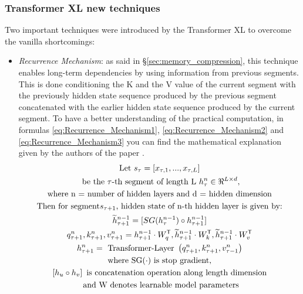 \subsubsection{Transformer XL new techniques}

Two important techniques were introduced by the Transformer XL to overcome the vanilla shortcomings:
\begin{itemize}
	\item \textit{Recurrence Mechanism}: as said in \S\ref{sec:memory_compression}, this technique enables long-term dependencies by using information from previous segments. This is done conditioning the K and the V value of the current segment with the previously hidden state sequence produced by the previous segment concatenated with the earlier hidden state sequence produced by the current segment.
	To have a better understanding of the practical computation, in formulas \ref{eq:Recurrence_Mechanism1}, \ref{eq:Recurrence_Mechanism2} and \ref{eq:Recurrence_Mechanism3} you can find the mathematical explanation given by the authors of the paper \cite{tranformerxl}.
	\begin{gather} 
	\text{Let } s_{\tau} = [x_{\tau, 1}, ... , x_{\tau, L}] \notag \\
	\text{ be the } \tau \text{-th segment of length L } h_{\tau}^{n} \in \Re^{L\times d}, \notag \\
	\text{where n = number of hidden layers and d = hidden dimension} \notag\\
	\text{Then for segment}  s_{\tau+1}\text{, hidden state of n-th hidden layer is given by:} \notag\\
	\widetilde{h}_{\tau+1}^{n-1} = [SG(h_{\tau}^{n-1}) \circ h_{\tau+1}^{n-1}] \label{eq:Recurrence_Mechanism1}\\
	q_{\tau+1}^{n}, k_{\tau+1}^{n}, v_{\tau+1}^{n} = h_{\tau+1}^{n-1} \cdot W_{q}^{\mathsf{T}}, \widetilde{h}_{\tau+1}^{n-1} \cdot W_{k}^{\mathsf{T}}, \widetilde{h}_{\tau+1}^{n-1} \cdot W_{v}^{\mathsf{T}} \label{eq:Recurrence_Mechanism2} \\
	h_{\tau+1}^{n}=\text { Transformer-Layer }\left(q_{\tau+1}^{n}, k_{\tau+1}^{n}, v_{\tau-1}^{n}\right) \label{eq:Recurrence_Mechanism3} \\
	\text{where } \mathrm{SG}(\cdot) \text{ is stop gradient,} \notag \\
	\left[h_{u} \circ h_{v}\right] \text{ is concatenation operation along length dimension} \notag \\
	\text{ and W denotes learnable model parameters} \notag
	\end{gather} 
	

\end{itemize}

